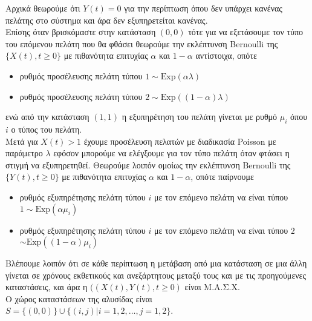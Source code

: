 \documentclass[a4paper,11pt]{article}
\newcommand{\Exp}{\mathrm{Exp}}
\newcommand{\mc}{Μ.Α.Σ.Χ. }
\begin{document}
Αρχικά θεωρούμε ότι $Y(t)=0$ για την περίπτωση όπου δεν υπάρχει κανένας πελάτης στο σύστημα και άρα δεν εξυπηρετείται κανένας.
\\[8pt]
Επίσης όταν βρισκόμαστε στην κατάσταση $(0,0)$ τότε για να εξετάσουμε τον τύπο του επόμενου πελάτη που θα φθάσει θεωρούμε την εκλέπτυνση Bernoulli της $\{X(t),t\geq 0\}$ με πιθανότητα επιτυχίας $\alpha$ και $1-\alpha$ αντίστοιχα, οπότε
\begin{itemize}
	\item ρυθμός προσέλευσης πελάτη τύπου $1 \sim \Exp(\alpha \lambda)$
	\item ρυθμός προσέλευσης πελάτη τύπου $2 \sim \Exp((1-\alpha) \lambda)$
\end{itemize}
ενώ από την κατάσταση $(1,1)$ η εξυπηρέτηση του πελάτη γίνεται με ρυθμό $\mu_i$ όπου $i$ ο τύπος του πελάτη.
\\[8pt]
Μετά για $X(t)>1$ έχουμε προσέλευση πελατών με διαδικασία Poisson με παράμετρο $\lambda$ εφόσον μπορούμε να ελέγξουμε για τον τύπο πελάτη όταν φτάσει η στιγμή να εξυπηρετηθεί.
Θεωρούμε λοιπόν ομοίως την εκλέπτυνση Bernoulli της $\{Y(t),t\geq 0\}$ με πιθανότητα επιτυχίας $\alpha$ και $1-\alpha$, οπότε παίρνουμε
\begin{itemize}
	\item ρυθμός εξυπηρέτησης πελάτη τύπου $i$ με τον επόμενο πελάτη να είναι τύπου $1 \sim \Exp(\alpha \mu_i)$
	\item ρυθμός εξυπηρέτησης πελάτη τύπου $i$ με τον επόμενο πελάτη να είναι τύπου $2$\\
		$\sim \Exp((1-\alpha) \mu_i)$
\end{itemize}
Βλέπουμε λοιπόν ότι σε κάθε περίπτωση η μετάβαση από μια κατάσταση σε μια άλλη γίνεται σε χρόνους εκθετικούς και ανεξάρτητους μεταξύ τους και με τις προηγούμενες καταστάσεις, και άρα η $((X(t),Y(t),t\geq 0)$ είναι \mc
\\[8pt]
Ο χώρος καταστάσεων της αλυσίδας είναι $S = \{(0,0)\} \cup \{(i,j)|i=1,2,\dots, j=1,2\}$.
\end{document}
